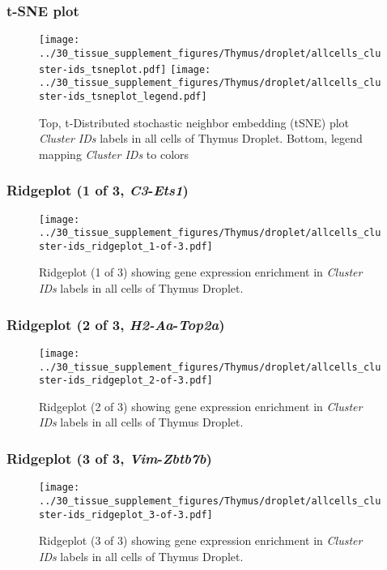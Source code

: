 \clearpage
\subsubsection{t-SNE plot}
\begin{figure}[h]
\centering
\texttt{[image: ../30\_tissue\_supplement\_figures/Thymus/droplet/allcells\_cluster-ids\_tsneplot.pdf]}
\texttt{[image: ../30\_tissue\_supplement\_figures/Thymus/droplet/allcells\_cluster-ids\_tsneplot\_legend.pdf]}
\caption{Top, t-Distributed stochastic neighbor embedding (tSNE) plot  \emph{Cluster IDs} labels in all cells of Thymus Droplet. Bottom, legend mapping \emph{Cluster IDs} to colors}
\end{figure}


\clearpage

\subsubsection{Ridgeplot (1 of 3, \emph{C3}-\emph{Ets1})}
\begin{figure}[h]
\centering
\texttt{[image: ../30\_tissue\_supplement\_figures/Thymus/droplet/allcells\_cluster-ids\_ridgeplot\_1-of-3.pdf]}

\caption{ Ridgeplot (1 of 3)  showing gene expression enrichment in \emph{Cluster IDs} labels in all cells of Thymus Droplet. }
\end{figure}


\clearpage

\subsubsection{Ridgeplot (2 of 3, \emph{H2-Aa}-\emph{Top2a})}
\begin{figure}[h]
\centering
\texttt{[image: ../30\_tissue\_supplement\_figures/Thymus/droplet/allcells\_cluster-ids\_ridgeplot\_2-of-3.pdf]}

\caption{ Ridgeplot (2 of 3)  showing gene expression enrichment in \emph{Cluster IDs} labels in all cells of Thymus Droplet. }
\end{figure}


\clearpage

\subsubsection{Ridgeplot (3 of 3, \emph{Vim}-\emph{Zbtb7b})}
\begin{figure}[h]
\centering
\texttt{[image: ../30\_tissue\_supplement\_figures/Thymus/droplet/allcells\_cluster-ids\_ridgeplot\_3-of-3.pdf]}

\caption{ Ridgeplot (3 of 3)  showing gene expression enrichment in \emph{Cluster IDs} labels in all cells of Thymus Droplet. }
\end{figure}


